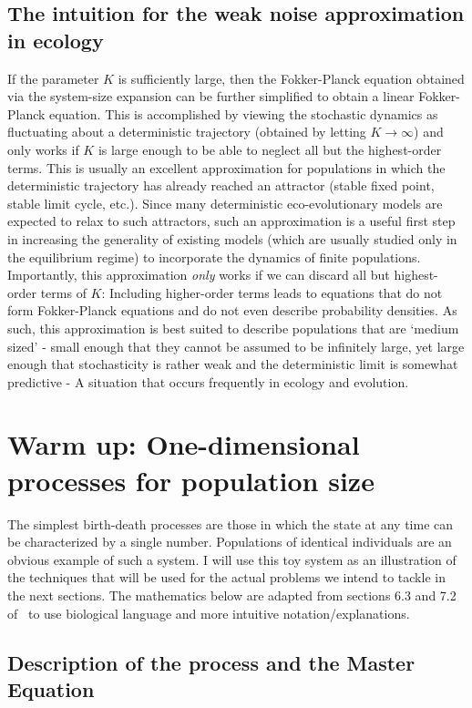 \subsection{The intuition for the weak noise approximation in ecology}
If the parameter $K$ is sufficiently large, then the Fokker-Planck equation obtained via the system-size expansion can be further simplified to obtain a linear Fokker-Planck equation. This is accomplished by viewing the stochastic dynamics as fluctuating about a deterministic trajectory (obtained by letting $K \to \infty$) and only works if $K$ is large enough to be able to neglect all but the highest-order terms. This is usually an excellent approximation for populations in which the deterministic trajectory has already reached an attractor (stable fixed point, stable limit cycle, etc.). Since many deterministic eco-evolutionary models are expected to relax to such attractors, such an approximation is a useful first step in increasing the generality of existing models (which are usually studied only in the equilibrium regime) to incorporate the dynamics of finite populations. Importantly, this approximation \emph{only} works if we can discard all but highest-order terms of $K$: Including higher-order terms leads to equations that do not form Fokker-Planck equations and do not even describe probability densities. As such, this approximation is best suited to describe populations that are `medium sized' - small enough that they cannot be assumed to be infinitely large, yet large enough that stochasticity is rather weak and the deterministic limit is somewhat predictive - A situation that occurs frequently in ecology and evolution.

\section{Warm up: One-dimensional processes for population size}\label{sec_1D_processes}
The simplest birth-death processes are those in which the state at any time can be characterized by a single number. Populations of identical individuals are an obvious example of such a system. I will use this toy system as an illustration of the techniques that will be used for the actual problems we intend to tackle in the next sections. The mathematics below are adapted from sections 6.3 and 7.2 of~\cite{gardiner_stochastic_2009} to use biological language and more intuitive notation/explanations.

\subsection{Description of the process and the Master Equation}

